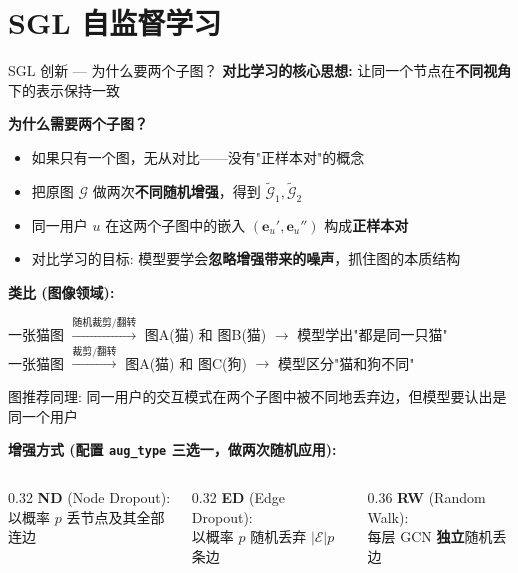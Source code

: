 \documentclass[9pt, aspectratio=169]{ctexbeamer}
\begin{document}
\section{SGL 自监督学习}
\begin{frame}{SGL 创新 --- 为什么要两个子图？}
  \textbf{对比学习的核心思想:} 让同一个节点在\textbf{不同视角}下的表示保持一致

  \vspace{0.3em}
  \textbf{为什么需要两个子图？}
  \begin{itemize}\footnotesize
    \item 如果只有一个图，无从对比——没有"正样本对"的概念
    \item 把原图 $\mathcal{G}$ 做两次\textbf{不同随机增强}，得到 $\tilde{\mathcal{G}}_1,\tilde{\mathcal{G}}_2$
    \item 同一用户 $u$ 在这两个子图中的嵌入 $(\mathbf{e}_u',\mathbf{e}_u'')$ 构成\textbf{正样本对}
    \item 对比学习的目标: 模型要学会\textbf{忽略增强带来的噪声}，抓住图的本质结构
  \end{itemize}

  \vspace{0.3em}
  \textbf{类比 (图像领域):}
  \begin{center}
    一张猫图 $\xrightarrow{\text{随机裁剪/翻转}}$ 图A(猫) 和 图B(猫) $\to$ 模型学出"都是同一只猫" \\
    一张猫图 $\xrightarrow{\text{裁剪/翻转}}$ 图A(猫) 和 图C(狗) $\to$ 模型区分"猫和狗不同"
  \end{center}
  图推荐同理: 同一用户的交互模式在两个子图中被不同地丢弃边，但模型要认出是同一个用户

  \vspace{0.3em}
  \textbf{增强方式 (配置 \texttt{aug\_type} 三选一，做两次随机应用):}
  \begin{columns}[t]
    \begin{column}{0.32\textwidth}\footnotesize
      \textbf{ND} (Node Dropout):\\
      以概率 $p$ 丢节点及其全部连边
    \end{column}
    \begin{column}{0.32\textwidth}\footnotesize
      \textbf{ED} (Edge Dropout):\\
      以概率 $p$ 随机丢弃 $|\mathcal{E}|p$ 条边
    \end{column}
    \begin{column}{0.36\textwidth}\footnotesize
      \textbf{RW} (Random Walk):\\
      每层 GCN \textbf{独立}随机丢边
    \end{column}
  \end{columns}
\end{frame}
\end{document}
